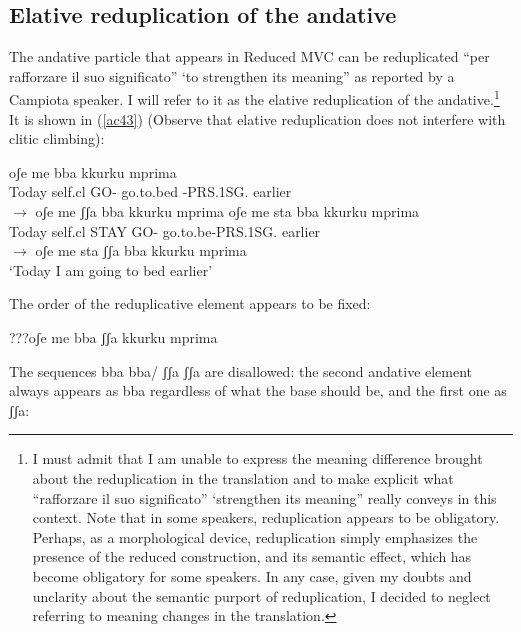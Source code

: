 \documentclass[output=paper]{langscibook}
\begin{document}
\subsection{Elative reduplication of the andative}

The andative particle that appears in Reduced MVC can be reduplicated “per rafforzare il suo significato” ‘to strengthen its meaning” as reported by a Campiota speaker.  I will refer to it as the elative reduplication of the andative.\footnote{I must admit that I am unable to express the meaning difference brought about the reduplication in the translation and to make explicit what “rafforzare il suo significato” ‘strengthen its meaning” really conveys in this context.  Note that in some speakers, reduplication appears to be obligatory.  Perhaps, as a morphological device, reduplication simply emphasizes the presence of the reduced construction, and its semantic effect, which has become obligatory for some speakers. In any case, given my doubts and unclarity about the semantic purport of reduplication, I decided to neglect referring to meaning changes in the translation.}  It is shown in (\ref{ac43}) (Observe that elative reduplication does not interfere with clitic climbing):

\ea \label{ac43}
    \ea \label{ac43a}
        \ea \label{ac43ai}\gll oʃe    me      bba   kkurku         mprima\\
       Today self.cl    GO-   go.to.bed -PRS.1SG.   earlier\\
        \ex \label{ac43aii}$\rightarrow$ oʃe    me    ʃʃa  bba   kkurku         mprima
        \z
    \ex \label{ac43b}
        \ea \label{ac43bi}\gll oʃe    me   sta     bba  kkurku      mprima\\
       Today self.cl  STAY  GO-  go.to.be-PRS.1SG.   earlier\\
        \ex   \label{ac43bii}$\rightarrow$ oʃe    me   sta   ʃʃa bba  kkurku mprima\\
       ‘Today I am going to bed earlier’  
        \z
    \z
\z
 
The order of the reduplicative element appears to be fixed:

\ea \label{ac44}???oʃe me bba ʃʃa kkurku mprima
\z

The sequences bba bba/ ʃʃa ʃʃa are disallowed: the second andative element always appears as bba regardless of what the base should be, and the first one as ʃʃa:
\end{document}
